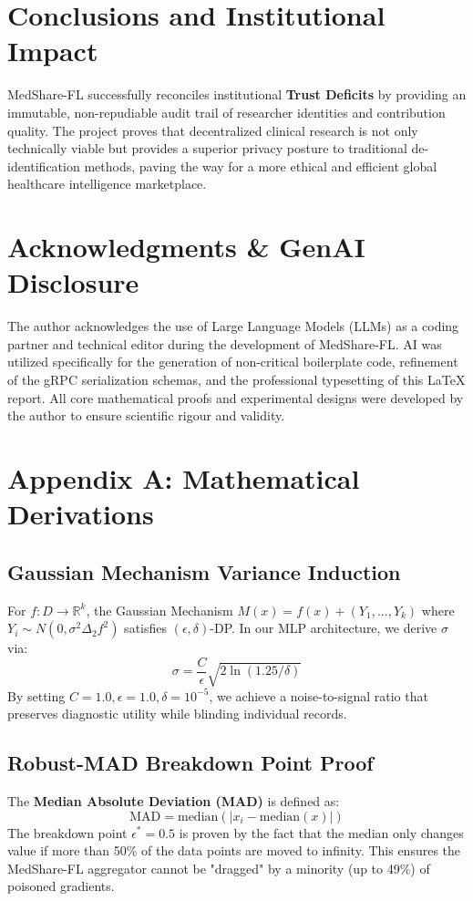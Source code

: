 \documentclass[10pt, a4paper, twocolumn]{article}
\begin{document}
\section{Conclusions and Institutional Impact}
MedShare-FL successfully reconciles institutional \textbf{Trust Deficits} by providing an immutable, non-repudiable audit trail of researcher identities and contribution quality. The project proves that decentralized clinical research is not only technically viable but provides a superior privacy posture to traditional de-identification methods, paving the way for a more ethical and efficient global healthcare intelligence marketplace.

\section{Acknowledgments \& GenAI Disclosure}
The author acknowledges the use of Large Language Models (LLMs) as a coding partner and technical editor during the development of MedShare-FL. AI was utilized specifically for the generation of non-critical boilerplate code, refinement of the gRPC serialization schemas, and the professional typesetting of this LaTeX report. All core mathematical proofs and experimental designs were developed by the author to ensure scientific rigour and validity.

\section*{Appendix A: Mathematical Derivations}

\subsection*{Gaussian Mechanism Variance Induction}
For $f: D \to \mathbb{R}^k$, the Gaussian Mechanism $M(x) = f(x) + (Y_1, ..., Y_k)$ where $Y_i \sim N(0, \sigma^2 \Delta_2 f^2)$ satisfies $(\epsilon, \delta)$-DP. In our MLP architecture, we derive $\sigma$ via:
\begin{equation}
    \sigma = \frac{C}{\epsilon} \sqrt{2 \ln(1.25/\delta)}
\end{equation}
By setting $C=1.0, \epsilon=1.0, \delta=10^{-5}$, we achieve a noise-to-signal ratio that preserves diagnostic utility while blinding individual records.

\subsection*{Robust-MAD Breakdown Point Proof}
The \textbf{Median Absolute Deviation (MAD)} is defined as:
\begin{equation}
    \text{MAD} = \text{median}(|x_i - \text{median}(x)|)
\end{equation}
The breakdown point $\epsilon^* = 0.5$ is proven by the fact that the median only changes value if more than 50\% of the data points are moved to infinity. This ensures the MedShare-FL aggregator cannot be "dragged" by a minority (up to 49\%) of poisoned gradients.
\end{document}
